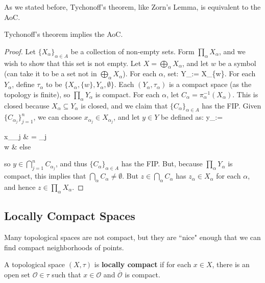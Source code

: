 	As we stated before, Tychonoff's theorem, like Zorn's Lemma, is equivalent to the AoC.
	
	\begin{theorem}
		Tychonoff's theorem implies the AoC.
	\end{theorem}
	
	\begin{proof}
		Let $\{X_\alpha\}_{\alpha\in A}$ be a collection of non-empty sets. Form $\prod_\alpha X_\alpha$, and we wish to 
		show that this set is not empty. Let $X = \bigoplus_\alpha X_\alpha$, and let $w$ be a symbol (can take it to 
		be a set not in $\bigoplus_\alpha X_\alpha$). For each $\alpha$, set:
		\eq
			Y_\alpha := X_\alpha\cup\{w\}.
		\qe
		For each $Y_\alpha$, define $\tau_\alpha$ to be $\{X_\alpha, \{w\}, Y_\alpha, \emptyset\}$. Each $(Y_\alpha, 
		\tau_\alpha)$ is a compact space (as the topology is finite), so $\prod_\alpha Y_\alpha$ is compact. For each 
		$\alpha$, let $C_\alpha = \pi_\alpha^{-1}(X_\alpha)$. This is closed because $X_\alpha\subseteq Y_\alpha$ is 
		closed, and we claim that $\{C_\alpha\}_{\alpha\in A}$ has the FIP. Given $\{C_{\alpha_j}\}_{j = 1}^n$, we can 
		choose $x_{\alpha_j}\in X_{\alpha_j}$, and let $y\in Y$ be defined as:
		\eq
			y_\alpha := \begin{cases}
				x_{\alpha_j} & \alpha = \alpha_j \\
				w & else
			\end{cases}
		\qe
		so $y\in \bigcap_{j = 1}^n C_{\alpha_j}$, and thus $\{C_\alpha\}_{\alpha\in A}$ has the FIP. But, because 
		$\prod_\alpha Y_\alpha$ is compact, this implies that $\bigcap_\alpha C_\alpha\neq\emptyset$. But $z\in 
		\bigcap_\alpha C_\alpha$ has $z_\alpha\in X_\alpha$ for each $\alpha$, and hence $z\in\prod_\alpha X_\alpha$.
	\end{proof}
	
\subsection{Locally Compact Spaces}

	Many topological spaces are not compact, but they are ``nice" enough that we can find compact neighborhoods of 
	points. 
	
	\begin{definition}
		A topological space $(X, \tau)$ is \textbf{locally compact} if for each $x\in X$, there is an open set $\mathcal O
		\in\tau$ such that $x\in\mathcal O$ and $\overline{\mathcal O}$ is compact.
	\end{definition}
	
